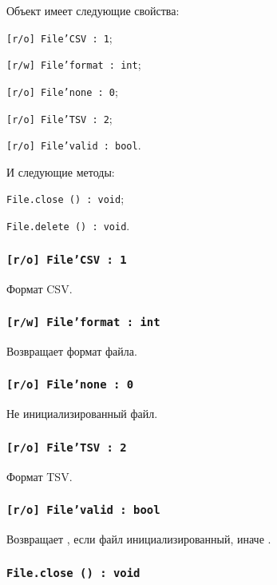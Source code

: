 Объект \file{} имеет следующие свойства:
\begin{icItems}
	\item \texttt{[r/o] File'CSV : 1};
	\item \texttt{[r/w] File'format : int};
	\item \texttt{[r/o] File'none : 0};
	\item \texttt{[r/o] File'TSV : 2};
	\item \texttt{[r/o] File'valid : bool}.
\end{icItems}

И следующие методы:
\begin{icItems}
	\item \texttt{File.close () : void};
	\item \texttt{File.delete () : void}.
\end{icItems}

\subsubsection{\texttt{[r/o] File'CSV : 1}}

Формат CSV.

\subsubsection{\texttt{[r/w] File'format : int}}

Возвращает формат файла.

\subsubsection{\texttt{[r/o] File'none : 0}}

Не инициализированный файл.

\subsubsection{\texttt{[r/o] File'TSV : 2}}

Формат TSV.

\subsubsection{\texttt{[r/o] File'valid : bool}}

Возвращает \true, если файл инициализированный, иначе \false.

\subsubsection{\texttt{File.close () : void}}

